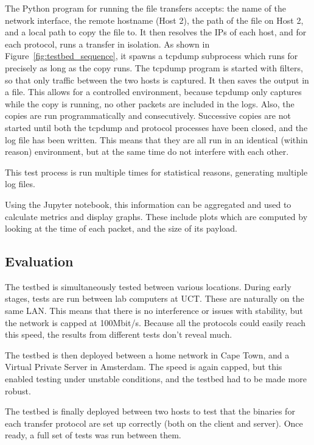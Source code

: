 \documentclass{sig-alternate-05-2015}
\begin{document}
The Python program for running the file transfers accepts: the name of the network interface, the remote hostname (Host 2), the path of the file on Host 2, and a local path to copy the file to.
It then resolves the IPs of each host, and for each protocol, runs a transfer in isolation. 
As shown in Figure~\ref{fig:testbed_sequence}, it spawns a tcpdump subprocess which runs for precisely as long as the copy runs. The tcpdump program is started with filters, so that only traffic between the two hosts is captured. It then saves the output in a file.
This allows for a controlled environment, because tcpdump only captures while the copy is running, no other packets are included in the logs. Also, the copies are run programmatically and consecutively. Successive copies are not started until both the tcpdump and protocol processes have been closed, and the log file has been written. This means that they are all run in an identical (within reason) environment, but at the same time do not interfere with each other.

This test process is run multiple times for statistical reasons, generating multiple log files.

Using the Jupyter notebook, this information can be aggregated and used to calculate metrics and display graphs. These include plots which are computed by looking at the time of each packet, and the size of its payload.


\subsection{Evaluation}
The testbed is simultaneously tested between various locations. During early stages, tests are run between lab computers at UCT. These are naturally on the same LAN. This means that there is no interference or issues with stability, but the network is capped at 100Mbit/s. Because all the protocols could easily reach this speed, the results from different tests don't reveal much.

The testbed is then deployed between a home network in Cape Town, and a Virtual Private Server in Amsterdam. The speed is again capped, but this enabled testing under unstable conditions, and the testbed had to be made more robust.

The testbed is finally deployed between two hosts to test that the binaries for each transfer protocol are set up correctly (both on the client and server). Once ready, a full set of tests was run between them.
\end{document}
